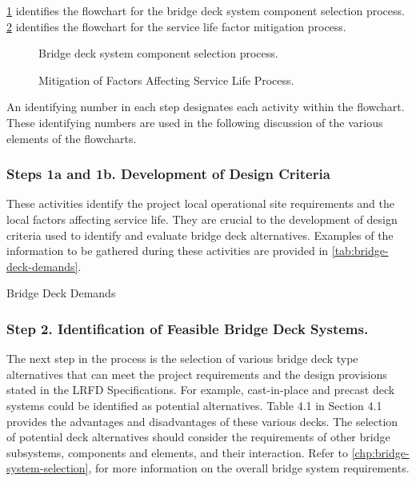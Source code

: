 \cref{fig:deck-selection-process} identifies the flowchart for the bridge deck system component selection process. \cref{fig:mitigation-process}
identifies the flowchart for the service life factor mitigation process.

\begin{figure}
  \caption{Bridge deck system component selection process.}\label{fig:deck-selection-process}
\end{figure}

\begin{figure}
  \caption{Mitigation of Factors Affecting Service Life Process.}\label{fig:mitigation-process}
\end{figure}

An identifying number in each step designates each activity within the flowchart. These identifying numbers are used in the following discussion of the various elements of the flowcharts.

\subsubsection*{Steps 1a and 1b. Development of Design Criteria}
These activities identify the project local operational site requirements and the local factors affecting service life.
They are crucial to the development of design criteria used to identify and evaluate bridge deck alternatives.
Examples of the information to be gathered during these activities are provided in \cref{tab:bridge-deck-demands}.

\begin{table}
  \caption{Bridge Deck Demands}\label{tab:bridge-deck-demands}
\end{table}

\subsubsection*{Step 2. Identification of Feasible Bridge Deck Systems.}
The next step in the process is the selection of various bridge deck type alternatives that can meet the project requirements and the design provisions stated in the LRFD Specifications. For example, cast-in-place and precast deck systems could be identified as potential alternatives. Table 4.1 in Section 4.1 provides the advantages and disadvantages of these various decks. The selection of potential deck alternatives should consider the requirements of other bridge subsystems, components and elements, and their interaction. Refer to \cref{chp:bridge-system-selection}, for more information on the overall bridge system requirements.

